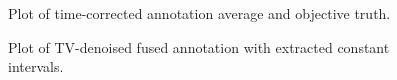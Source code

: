 \documentclass[preview]{standalone}
\begin{document}
\begin{figure*}
	\centering
	\captionsetup[subfigure]{justification=centering}
	\begin{subfigure}{\textwidth}
    
 	\caption{Plot of time-corrected annotation average and objective truth.}
	\label{Fig:average_and_objective}
	\end{subfigure}
    
	\begin{subfigure}{\textwidth}
    
	\caption{Plot of TV-denoised fused annotation with extracted constant intervals.}
	\label{Fig:tv_and_intervals}
	\end{subfigure}
\end{figure*}
\end{document}
